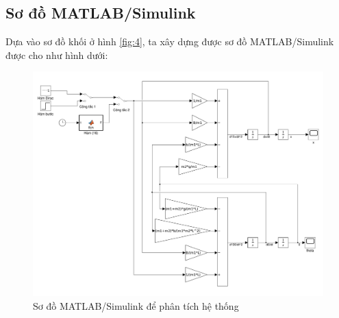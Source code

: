 \documentclass[12pt,a4paper]{article}
\begin{document}
\subsection{Sơ đồ MATLAB/Simulink}

Dựa vào sơ đồ khối ở hình \ref{fig:4}, ta xây dựng được sơ đồ MATLAB/Simulink được cho như hình dưới: 

\begin{landscape}

\begin{figure}[ht]
    \centering
    \includegraphics[height=0.5\paperheight]{MATLAB_1.pdf}
    \caption{Sơ đồ MATLAB/Simulink để phân tích hệ thống}
    \label{fig:m1}
\end{figure}
\end{landscape}
\end{document}
